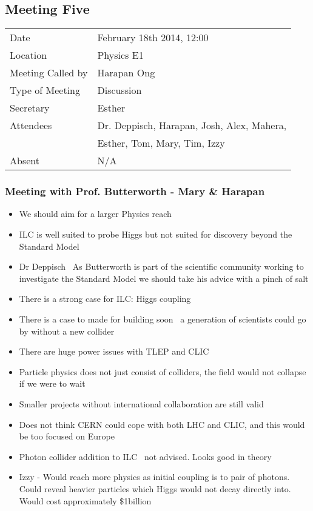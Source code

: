 \subsection{Meeting Five}

\begin{tabular}{l l}
  Date & February 18th 2014, 12:00 \\
  Location & Physics E1 \\
  Meeting Called by & Harapan Ong \\
  Type of Meeting & Discussion \\
  Secretary & Esther \\
  Attendees & Dr. Deppisch, Harapan, Josh, Alex, Mahera, \\ & Esther, Tom, Mary, Tim, Izzy \\
  Absent & N/A \\  
\end{tabular}


\subsubsection{Meeting with Prof. Butterworth - Mary \& Harapan}

\begin{itemize}
\item We should aim for a larger Physics reach
\item  ILC is well suited to probe Higgs but not suited for discovery beyond the Standard Model
\item  Dr Deppisch  \textemdash \, As Butterworth is part of the scientific community working to investigate the Standard Model we should take his advice with a pinch of salt
\item  There is a strong case for ILC: Higgs coupling
\item  There is a case to made for building soon  \textemdash \, a generation of scientists could go by without a new collider
\item  There are huge power issues with TLEP and CLIC
\item  Particle physics does not just consist of colliders, the field would not collapse if we were to wait
\item  Smaller projects without international collaboration are still valid
\item  Does not think CERN could cope with both LHC and CLIC, and this would be too focused on Europe
\item  Photon collider addition to ILC  \textemdash \, not advised. Looks good in theory
\item  Izzy - Would reach more physics as initial coupling is to pair of photons. Could reveal heavier particles which Higgs would not decay directly into. Would cost approximately \$1billion
\end{itemize}



